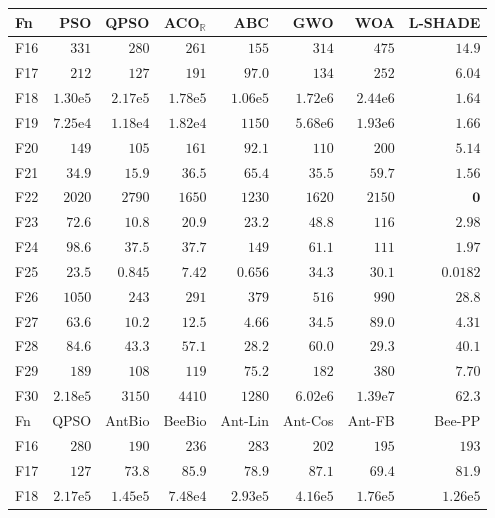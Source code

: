 \begin{tabular}{lrrrrrrr}
\toprule
Fn & PSO & QPSO & ACO$_\mathbb{R}$ & ABC & GWO & WOA & L-SHADE \\
\midrule
F16 & $331$ & $280$ & $261$ & $155$ & $314$ & $475$ & $\mathbf{14.9}$ \\
F17 & $212$ & $127$ & $191$ & $97.0$ & $134$ & $252$ & $\mathbf{6.04}$ \\
F18 & $1.30\mathrm{e}{5}$ & $2.17\mathrm{e}{5}$ & $1.78\mathrm{e}{5}$ & $1.06\mathrm{e}{5}$ & $1.72\mathrm{e}{6}$ & $2.44\mathrm{e}{6}$ & $\mathbf{1.64}$ \\
F19 & $7.25\mathrm{e}{4}$ & $1.18\mathrm{e}{4}$ & $1.82\mathrm{e}{4}$ & $1150$ & $5.68\mathrm{e}{6}$ & $1.93\mathrm{e}{6}$ & $\mathbf{1.66}$ \\
F20 & $149$ & $105$ & $161$ & $92.1$ & $110$ & $200$ & $\mathbf{5.14}$ \\
F21 & $34.9$ & $15.9$ & $36.5$ & $65.4$ & $35.5$ & $59.7$ & $\mathbf{1.56}$ \\
F22 & $2020$ & $2790$ & $1650$ & $1230$ & $1620$ & $2150$ & $\mathbf{0}$ \\
F23 & $72.6$ & $10.8$ & $20.9$ & $23.2$ & $48.8$ & $116$ & $\mathbf{2.98}$ \\
F24 & $98.6$ & $37.5$ & $37.7$ & $149$ & $61.1$ & $111$ & $\mathbf{1.97}$ \\
F25 & $23.5$ & $0.845$ & $7.42$ & $0.656$ & $34.3$ & $30.1$ & $\mathbf{0.0182}$ \\
F26 & $1050$ & $243$ & $291$ & $379$ & $516$ & $990$ & $\mathbf{28.8}$ \\
F27 & $63.6$ & $10.2$ & $12.5$ & $4.66$ & $34.5$ & $89.0$ & $\mathbf{4.31}$ \\
F28 & $84.6$ & $43.3$ & $57.1$ & $28.2$ & $60.0$ & $29.3$ & $40.1$ \\
F29 & $189$ & $108$ & $119$ & $75.2$ & $182$ & $380$ & $\mathbf{7.70}$ \\
F30 & $2.18\mathrm{e}{5}$ & $3150$ & $4410$ & $1280$ & $6.02\mathrm{e}{6}$ & $1.39\mathrm{e}{7}$ & $\mathbf{62.3}$ \\
\midrule
Fn & QPSO & AntBio & BeeBio & Ant-Lin & Ant-Cos & Ant-FB & Bee-PP \\
\midrule
F16 & $280$ & $190$ & $236$ & $283$ & $202$ & $195$ & $193$ \\
F17 & $127$ & $73.8$ & $85.9$ & $78.9$ & $87.1$ & $69.4$ & $81.9$ \\
F18 & $2.17\mathrm{e}{5}$ & $1.45\mathrm{e}{5}$ & $7.48\mathrm{e}{4}$ & $2.93\mathrm{e}{5}$ & $4.16\mathrm{e}{5}$ & $1.76\mathrm{e}{5}$ & $1.26\mathrm{e}{5}$ \\

\end{tabular}
